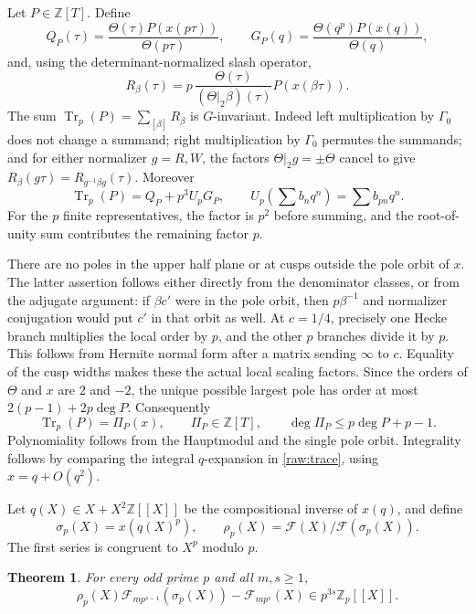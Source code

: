 \documentclass[11pt,a4paper]{article}
\newtheorem{theorem}{Theorem}[section]
\begin{document}
Let $P\in\mathbb Z[T]$.  Define
\[
 Q_P(\tau)=\frac{\Theta(\tau)P(x(p\tau))}{\Theta(p\tau)},\qquad
 G_P(q)=\frac{\Theta(q^p)P(x(q))}{\Theta(q)},
\]
and, using the determinant-normalized slash operator,
\[
 R_\beta(\tau)=p\,
       \frac{\Theta(\tau)}{(\Theta|_2\beta)(\tau)}P(x(\beta\tau)).
\]
The sum $\operatorname{Tr}_p(P)=\sum_{[\beta]}R_\beta$ is $G$-invariant.
Indeed left multiplication by $\Gamma_0$ does not change a summand;
right multiplication by $\Gamma_0$ permutes the summands; and for either
normalizer $g=R,W$, the factors $\Theta|_2g=\pm\Theta$ cancel to give
$R_\beta(g\tau)=R_{g^{-1}\beta g}(\tau)$.  Moreover
\begin{equation}\label{raw:trace}
 \operatorname{Tr}_p(P)=Q_P+p^3U_pG_P,
 \qquad U_p\left(\sum b_nq^n\right)=\sum b_{pn}q^n.
\end{equation}
For the $p$ finite representatives, the factor is $p^2$ before summing,
and the root-of-unity sum contributes the remaining factor $p$.

There are no poles in the upper half plane or at cusps outside the pole
orbit of $x$.  The latter assertion follows either directly from the
denominator classes, or from the adjugate argument: if $\beta c'$ were in
the pole orbit, then $p\beta^{-1}$ and normalizer conjugation would put
$c'$ in that orbit as well.
At $c=1/4$, precisely one Hecke branch multiplies the local order by $p$,
and the other $p$ branches divide it by $p$.  This follows from Hermite
normal form after a matrix sending $\infty$ to $c$.  Equality of the cusp
widths makes these the actual local scaling factors.  Since the orders of
$\Theta$ and $x$ are $2$ and $-2$, the unique possible largest pole has
order at most $2(p-1)+2p\deg P$.  Consequently
\begin{equation}\label{raw:tracepoly}
 \operatorname{Tr}_p(P)=\Pi_P(x),\qquad
 \Pi_P\in\mathbb Z[T],\qquad
 \deg\Pi_P\leq p\deg P+p-1.
\end{equation}
Polynomiality follows from the Hauptmodul and the single pole orbit.
Integrality follows by comparing the integral $q$-expansion in
\eqref{raw:trace}, using $x=q+O(q^2)$.

Let $q(X)\in X+X^2\mathbb Z[[X]]$ be the compositional inverse of $x(q)$,
and define
\[
 \sigma_p(X)=x(q(X)^p),\qquad
 \rho_p(X)=\mathcal F(X)/\mathcal F(\sigma_p(X)).
\]
The first series is congruent to $X^p$ modulo $p$.

\begin{theorem}\label{raw:formal}
For every odd prime $p$ and all $m,s\geq1$,
\[
 \rho_p(X)\mathcal F_{mp^{s-1}}(\sigma_p(X))
       -\mathcal F_{mp^s}(X)
       \in p^{3s}\mathbb Z_p[[X]].
\]
\end{theorem}
\end{document}
